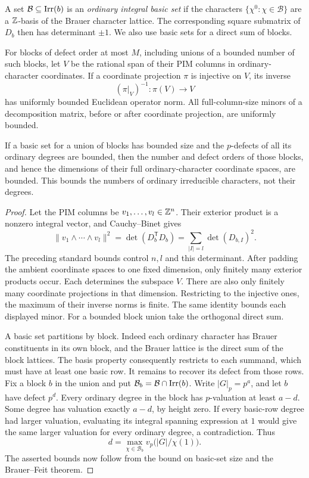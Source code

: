 A set \(\mathcal B\subseteq\operatorname{Irr}(b)\) is an \emph{ordinary integral
basic set} if the characters \(\{\chi^0:\chi\in\mathcal B\}\)
are a \(\mathbb Z\)-basis of the Brauer character lattice.
The corresponding square submatrix of \(D_b\) then has determinant
\(\pm1\).  We also use basic sets for a direct sum of blocks.

\begin{lemma}
\label{lem:row-projection}
For blocks of defect order at most \(M\), including unions of a
bounded number of such blocks, let \(V\) be the rational span of
their PIM columns in ordinary-character coordinates.
If a coordinate projection \(\pi\) is injective on \(V\), its inverse
\[
 (\pi|_V)^{-1}:\pi(V)\longrightarrow V
\]
has uniformly bounded Euclidean operator norm.  All full-column-size
minors of a decomposition matrix, before or after coordinate
projection, are uniformly bounded.

If a basic set for a union of blocks has bounded size and the
\(p\)-defects of all its ordinary degrees are bounded, then the number
and defect orders of those blocks, and hence the dimensions of their full ordinary-character coordinate
spaces, are bounded.  This bounds the numbers of ordinary irreducible
characters, not their degrees.
\end{lemma}

\begin{proof}
Let the PIM columns be \(v_1,\ldots,v_l\in\mathbb Z^n\).  Their exterior
product is a nonzero integral vector, and Cauchy--Binet gives
\[
 \|v_1\wedge\cdots\wedge v_l\|^2
    =\det(D_b^{\mathsf T}D_b)
    =\sum_{|I|=l}\det(D_{b,I})^2 .
\]
The preceding standard bounds control \(n,l\) and this determinant.
After padding the ambient coordinate spaces to one fixed dimension,
only finitely many exterior products occur.  Each determines the
subspace \(V\).  There are also only finitely many coordinate
projections in that dimension.  Restricting to the injective ones,
the maximum of their inverse norms is finite.  The same identity
bounds each displayed minor.  For a bounded block union take the
orthogonal direct sum.

A basic set partitions by block.  Indeed each ordinary character
has Brauer constituents in its own block, and the Brauer lattice is
the direct sum of the block lattices.  The basis property consequently
restricts to each summand, which must have at least one basic row.
It remains to recover its defect from those rows.
Fix a block \(b\) in the union and put
\(\mathcal B_b=\mathcal B\cap\operatorname{Irr}(b)\).
Write \(|G|_p=p^a\), and let \(b\) have defect \(p^d\).
Every ordinary degree in the block has \(p\)-valuation at least
\(a-d\).  Some degree has valuation exactly \(a-d\), by height zero.
If every basic-row degree had larger valuation, evaluating its
integral spanning expression at \(1\) would give the same larger
valuation for every ordinary degree, a contradiction.  Thus
\[
 d=\max_{\chi\in\mathcal B_b}
           v_p\bigl(|G|/\chi(1)\bigr).
\]
The asserted bounds now follow from the bound on basic-set size
and the Brauer--Feit theorem.
\end{proof}

